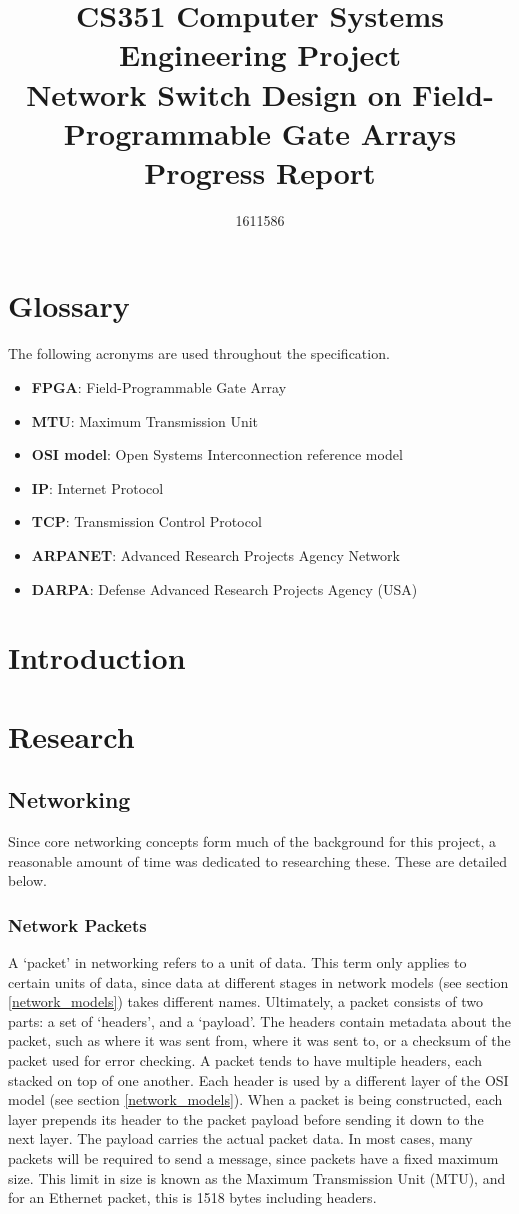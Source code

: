 \documentclass[12pt, a4paper, twoside, onecolumn]{article}
\title{CS351 Computer Systems Engineering Project \\ \vspace{0.5cm} Network Switch Design on Field-Programmable Gate Arrays \\ \vspace{0.3cm} \Large{Progress Report}}
\author{1611586}
\begin{document}


\tableofcontents
\newpage

\section{Glossary}
\label{glossary}
The following acronyms are used throughout the specification.
\begin{itemize}
  \item \textbf{FPGA}: Field-Programmable Gate Array
  \item \textbf{MTU}: Maximum Transmission Unit
  \item \textbf{OSI model}: Open Systems Interconnection reference model
  \item \textbf{IP}: Internet Protocol
  \item \textbf{TCP}: Transmission Control Protocol
  \item \textbf{ARPANET}: Advanced Research Projects Agency Network
  \item \textbf{DARPA}: Defense Advanced Research Projects Agency (USA)
\end{itemize}

\section{Introduction}
\label{introduction}




\section{Research}
\label{research}

\subsection{Networking}
Since core networking concepts form much of the background for this project, a reasonable amount of time was dedicated to researching these. These are detailed below.
\subsubsection{Network Packets}
A `packet' in networking refers to a unit of data. This term only applies to certain units of data, since data at different stages in network models (see section \ref{network_models}) takes different names. Ultimately, a packet consists of two parts: a set of `headers', and a `payload'. The headers contain metadata about the packet, such as where it was sent from, where it was sent to, or a checksum of the packet used for error checking. A packet tends to have multiple headers, each stacked on top of one another. Each header is used by a different layer of the OSI model (see section \ref{network_models}). When a packet is being constructed, each layer prepends its header to the packet payload before sending it down to the next layer. The payload carries the actual packet data. In most cases, many packets will be required to send a message, since packets have a fixed maximum size. This limit in size is known as the Maximum Transmission Unit (MTU), and for an Ethernet packet, this is 1518 bytes including headers.
\end{document}
